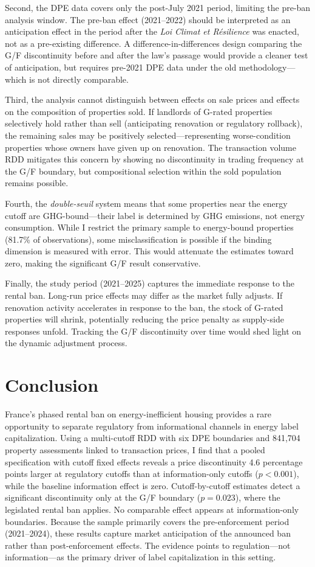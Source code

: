 \documentclass[12pt]{article}
\begin{document}
Second, the DPE data covers only the post-July 2021 period, limiting the pre-ban analysis window. The pre-ban effect (2021--2022) should be interpreted as an anticipation effect in the period after the \textit{Loi Climat et R\'esilience} was enacted, not as a pre-existing difference. A difference-in-differences design comparing the G/F discontinuity before and after the law's passage would provide a cleaner test of anticipation, but requires pre-2021 DPE data under the old methodology---which is not directly comparable.

Third, the analysis cannot distinguish between effects on sale prices and effects on the composition of properties sold. If landlords of G-rated properties selectively hold rather than sell (anticipating renovation or regulatory rollback), the remaining sales may be positively selected---representing worse-condition properties whose owners have given up on renovation. The transaction volume RDD mitigates this concern by showing no discontinuity in trading frequency at the G/F boundary, but compositional selection within the sold population remains possible.

Fourth, the \textit{double-seuil} system means that some properties near the energy cutoff are GHG-bound---their label is determined by GHG emissions, not energy consumption. While I restrict the primary sample to energy-bound properties (81.7\% of observations), some misclassification is possible if the binding dimension is measured with error. This would attenuate the estimates toward zero, making the significant G/F result conservative.

Finally, the study period (2021--2025) captures the immediate response to the rental ban. Long-run price effects may differ as the market fully adjusts. If renovation activity accelerates in response to the ban, the stock of G-rated properties will shrink, potentially reducing the price penalty as supply-side responses unfold. Tracking the G/F discontinuity over time would shed light on the dynamic adjustment process.


\section{Conclusion}

France's phased rental ban on energy-inefficient housing provides a rare opportunity to separate regulatory from informational channels in energy label capitalization. Using a multi-cutoff RDD with six DPE boundaries and 841,704 property assessments linked to transaction prices, I find that a pooled specification with cutoff fixed effects reveals a price discontinuity 4.6 percentage points larger at regulatory cutoffs than at information-only cutoffs ($p < 0.001$), while the baseline information effect is zero. Cutoff-by-cutoff estimates detect a significant discontinuity only at the G/F boundary ($p = 0.023$), where the legislated rental ban applies. No comparable effect appears at information-only boundaries. Because the sample primarily covers the pre-enforcement period (2021--2024), these results capture market anticipation of the announced ban rather than post-enforcement effects. The evidence points to regulation---not information---as the primary driver of label capitalization in this setting.
\end{document}
